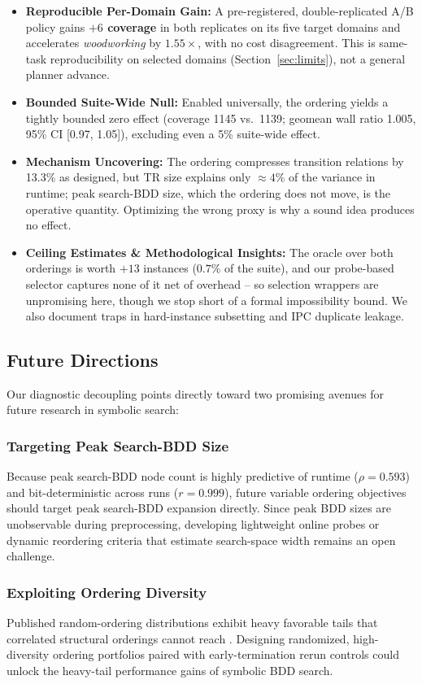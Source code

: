 \documentclass[twocolumn,10pt]{article}
\begin{document}
\begin{itemize}\setlength{\itemsep}{2pt}
    \item \textbf{Reproducible Per-Domain Gain:} A pre-registered, double-replicated A/B policy gains \textbf{$+6$ coverage} in both replicates on its five target domains and accelerates \textit{woodworking} by \textbf{$1.55\times$}, with no cost disagreement. This is same-task reproducibility on selected domains (Section~\ref{sec:limits}), not a general planner advance.

    \item \textbf{Bounded Suite-Wide Null:} Enabled universally, the ordering yields a tightly bounded zero effect (coverage 1145 vs.\ 1139; geomean wall ratio 1.005, 95\% CI [0.97, 1.05]), excluding even a 5\% suite-wide effect.

    \item \textbf{Mechanism Uncovering:} The ordering compresses transition relations by 13.3\% as designed, but TR size explains only ${\approx}4\%$ of the variance in runtime; peak search-BDD size, which the ordering does not move, is the operative quantity. Optimizing the wrong proxy is why a sound idea produces no effect.

    \item \textbf{Ceiling Estimates \& Methodological Insights:} The oracle over both orderings is worth $+13$ instances ($0.7\%$ of the suite), and our probe-based selector captures none of it net of overhead -- so selection wrappers are unpromising here, though we stop short of a formal impossibility bound. We also document traps in hard-instance subsetting and IPC duplicate leakage.
\end{itemize}

\subsection{Future Directions}
Our diagnostic decoupling points directly toward two promising avenues for future research in symbolic search:

\subsubsection{Targeting Peak Search-BDD Size}
Because peak search-BDD node count is highly predictive of runtime ($\rho = 0.593$) and bit-deterministic across runs ($r = 0.999$), future variable ordering objectives should target peak search-BDD expansion directly. Since peak BDD sizes are unobservable during preprocessing, developing lightweight online probes or dynamic reordering criteria that estimate search-space width remains an open challenge.

\subsubsection{Exploiting Ordering Diversity}
Published random-ordering distributions exhibit heavy favorable tails that correlated structural orderings cannot reach \cite{kissmann2014bdd}. Designing randomized, high-diversity ordering portfolios paired with early-termination rerun controls could unlock the heavy-tail performance gains of symbolic BDD search.

\small


\end{document}
